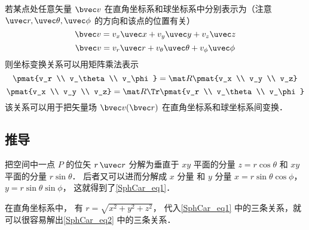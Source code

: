 若某点处任意矢量 $\bvec v$ 在直角坐标系和球坐标系中分别表示为（注意 $\uvec r, \uvec \theta, \uvec \phi$ 的方向和该点的位置有关）
\begin{equation}\label{SphCar_eq7}
\bvec v = v_x \uvec x + v_y \uvec y + v_z \uvec z
\end{equation}
\begin{equation}\label{SphCar_eq6}
\bvec v = v_r \uvec r + v_\theta \uvec \theta + v_\phi \uvec \phi
\end{equation}
则坐标变换关系可以用矩阵乘法表示
\begin{equation}\label{SphCar_eq9}
\pmat{v_r \\ v_\theta \\ v_\phi}
= \mat R \pmat{v_x \\ v_y \\ v_z}
\end{equation}
\begin{equation}\label{SphCar_eq8}
\pmat{v_x \\ v_y \\ v_z}
= \mat R\Tr \pmat{v_r \\ v_\theta \\ v_\phi}
\end{equation}
该关系可以用于把矢量场 $\bvec v(\bvec r)$ 在直角坐标系和球坐标系间变换．

\subsection{推导}
把空间中一点 $P$ 的位矢 $r \,\uvec r$ 分解为垂直于 $xy$ 平面的分量 $z = r\cos \theta $ 和 $xy$ 平面的分量 $r\sin \theta $． 后者又可以进而分解成 $x$ 分量 和 $y$ 分量  $x = r\sin \theta \cos \phi$，  $y = r\sin \theta \sin \phi$， 这就得到了\autoref{SphCar_eq1}．

在直角坐标系中， 有 $r = \sqrt {x^2 + y^2 + z^2}$， 代入\autoref{SphCar_eq1} 中的三条关系，就可以很容易解出\autoref{SphCar_eq2} 中的三条关系．

